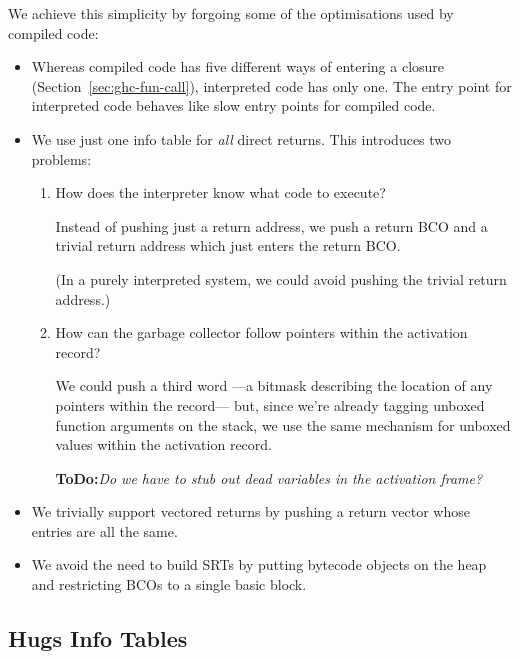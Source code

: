 \documentclass[11pt]{article}
\newcommand{\ToDo}[1]{{{\bf ToDo:}\sl #1}}
\newcommand{\secref}[1]{Section~\ref{sec:#1}}
\newcommand{\Subsection}[2]{\subsection{#1}\label{sec:#2}}
\begin{document}
We achieve this simplicity by forgoing some of the optimisations used
by compiled code:
\begin{itemize}
\item

Whereas compiled code has five different ways of entering a closure
(\secref{ghc-fun-call}), interpreted code has only one.
The entry point for interpreted code behaves like slow entry points for
compiled code.

\item

We use just one info table for \emph{all\/} direct returns.  
This introduces two problems:
\begin{enumerate}
\item How does the interpreter know what code to execute?

Instead of pushing just a return address, we push a return BCO and a 
trivial return address which just enters the return BCO.

(In a purely interpreted system, we could avoid pushing the trivial
return address.)

\item How can the garbage collector follow pointers within the
activation record?

We could push a third word ---a bitmask describing the location of any
pointers within the record--- but, since we're already tagging unboxed
function arguments on the stack, we use the same mechanism for unboxed
values within the activation record.

\ToDo{Do we have to stub out dead variables in the activation frame?}

\end{enumerate}

\item

We trivially support vectored returns by pushing a return vector whose
entries are all the same.

\item

We avoid the need to build SRTs by putting bytecode objects on the
heap and restricting BCOs to a single basic block.

\end{itemize}

\Subsection{Hugs Info Tables}{hugs-info-tables}
\end{document}
